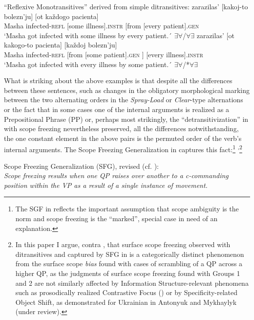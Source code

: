 \documentclass[output=paper,colorlinks,citecolor=brown,nonflat]{./langscibook}
\begin{document}
\ea%
    \label{ex:antonyuk:7}
    “Reflexive Monotransitives” derived from simple ditransitives:
    \ea \label{ex:antonyuk:7a}
       {zarazilas’}         {[kakoj-to} {bolezn’ju]} {[ot}      {každogo} {pacienta]}\\
    Masha infected-\textsc{refl}  [some illness].\textsc{instr} [from [every     patient].\textsc{gen}\\
    \glt `Masha got infected with some illness by every patient.´ \hfill ${\exists}{\forall}$/${\forall}{\exists}$
    \ex \label{ex:antonyuk:7b}
       {zarazilas’}          {[ot}      {kakogo-to} {pacienta]}      {} {[každoj} bolezn’ju]\\
    Masha infected-\textsc{refl}   [from [some         patient].\textsc{gen} ] [every illness].\textsc{instr}\\
    \glt `Masha got infected with every illness by some patient.´ \hfill ${\exists}{\forall}$/*${\forall}{\exists}$
    \z
\z

What is striking about the above examples is that despite all the differences between these sentences, such as changes in the obligatory morphological marking between the two alternating orders in the \textit{Spray-Load} or \textit{Clear}{}-type alternations or the fact that in some cases one of the internal arguments is realized as a Prepositional Phrase (PP) or, perhaps most strikingly, the “detransitivization” in  with scope freezing nevertheless preserved, all the differences notwithstanding, the one constant element in the above pairs is the permuted order of the verb’s internal arguments. The Scope Freezing Generalization in  captures this fact:\footnote{The SGF in  reflects the important assumption that scope ambiguity is the norm and scope freezing is the “marked”, special case in need of an explanation.} \textsuperscript{,}\footnote{In this paper I argue, contra \citet{Antonyuk2015}, that surface scope freezing observed with ditransitives and captured by SFG in  is a categorically distinct phenomenon from the surface scope \textit{bias} found with cases of scrambling of a QP across a higher QP, as the judgments of surface scope freezing found with Groups 1 and 2 are not similarly affected by Information Structure-relevant phenomena such as prosodically realized Contrastive Focus (\citealt{AntonyukLarson2016}) or by Specificity-related Object Shift, as demonstrated for Ukrainian in Antonyuk and Mykhaylyk (under review).}

\ea%
    \label{ex:antonyuk:8}
    Scope Freezing Generalization (SFG), revised (cf. \citealt{Antonyuk2015}):\\
    \textit{Scope freezing results when one QP raises over another to a c-commanding position within the VP as a result of a single instance of movement.}
    \z
\end{document}
